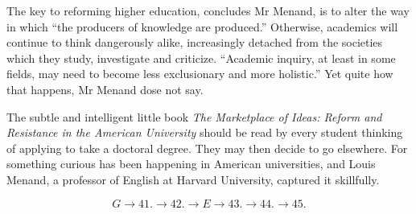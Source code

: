 \qquad [F] The key to reforming higher education, concludes Mr Menand, is to alter the way in which ``the producers of knowledge are produced.'' Otherwise, academics will continue to think dangerously alike, increasingly detached from the societies which they study, investigate and criticize. ``Academic inquiry, at least in some fields, may need to become less exclusionary and more holistic.'' Yet quite how that happens, Mr Menand dose not say.

\qquad [G] The subtle and intelligent little book \emph{The Marketplace of Ideas: Reform and Resistance in the American University} should be read by every student thinking of applying to take a doctoral degree. They may then decide to go elsewhere. For something curious has been happening in American universities, and Louis Menand, a professor of English at Harvard University, captured it skillfully.

\vspace{12pt}

\[G \to 41. \to 42. \to E \to 43. \to 44. \to 45.\]
